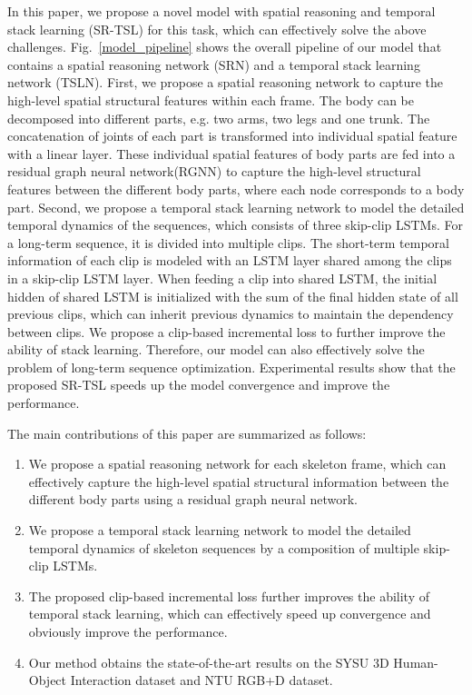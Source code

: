 \documentclass[runningheads]{llncs}
\begin{document}
In this paper, we propose a novel model with spatial reasoning and temporal stack learning (SR-TSL) for this task, which can effectively solve the above challenges. Fig.~\ref{model_pipeline} shows the overall pipeline of our model that contains a spatial reasoning network (SRN) and a temporal stack learning network (TSLN). First, we propose a spatial reasoning network to capture the high-level spatial structural features within each frame. The body can be decomposed into different parts, e.g. two arms, two legs and one trunk. The concatenation of joints of each part is transformed into individual spatial feature with a linear layer. These individual spatial features of body parts are fed into a residual graph neural network(RGNN) to capture the high-level structural features between the different body parts, where each node corresponds to a body part. Second, we propose a temporal stack learning network to model the detailed temporal dynamics of the sequences, which consists of three skip-clip LSTMs. For a long-term sequence, it is divided into multiple clips. The short-term temporal information of each clip is modeled with an LSTM layer shared among the clips in a skip-clip LSTM layer. When feeding a clip into shared LSTM, the initial hidden of shared LSTM is initialized with the sum of the final hidden state of all previous clips, which can inherit previous dynamics to maintain the dependency between clips. We propose a clip-based incremental loss to further improve the ability of stack learning. Therefore, our model can also effectively solve the problem of long-term sequence optimization. Experimental results show that the proposed SR-TSL speeds up the model convergence and improve the performance.


The main contributions of this paper are summarized as follows:
\begin{enumerate}
\item We propose a spatial reasoning network for each skeleton frame, which can effectively capture the high-level spatial structural information between the different body parts using a  residual graph neural network.
  \item We propose a temporal stack learning network to model the detailed temporal dynamics of skeleton sequences by a composition of multiple skip-clip LSTMs.
  \item The proposed clip-based incremental loss further improves the ability of temporal stack learning, which can effectively speed up convergence and obviously improve the performance.
  \item Our method obtains the state-of-the-art results on the SYSU 3D Human-Object Interaction dataset and NTU RGB+D dataset.
\end{enumerate}
\end{document}
